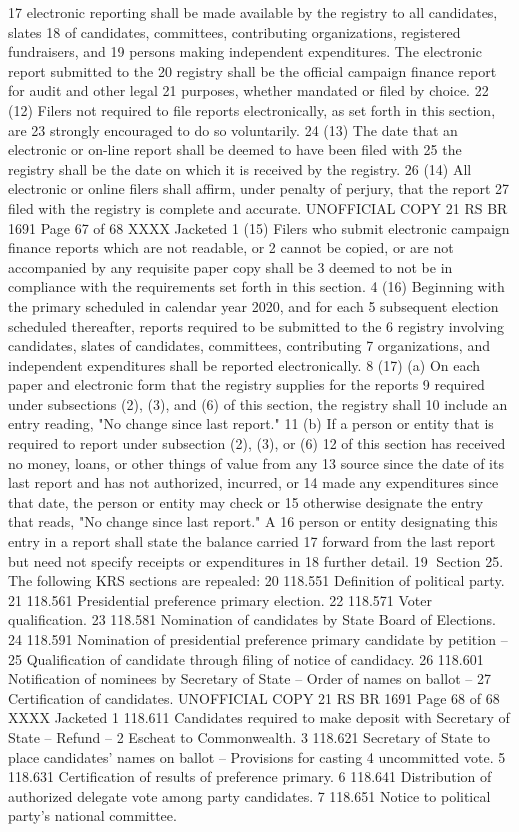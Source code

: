 17 electronic reporting shall be made available by the registry to all candidates, slates
18 of candidates, committees, contributing organizations, registered fundraisers, and
19 persons making independent expenditures. The electronic report submitted to the
20 registry shall be the official campaign finance report for audit and other legal
21 purposes, whether mandated or filed by choice.
22 (12) Filers not required to file reports electronically, as set forth in this section, are
23 strongly encouraged to do so voluntarily.
24 (13) The date that an electronic or on-line report shall be deemed to have been filed with
25 the registry shall be the date on which it is received by the registry.
26 (14) All electronic or online filers shall affirm, under penalty of perjury, that the report
27 filed with the registry is complete and accurate.
UNOFFICIAL COPY 21 RS BR 1691
Page 67 of 68
XXXX Jacketed
1 (15) Filers who submit electronic campaign finance reports which are not readable, or
2 cannot be copied, or are not accompanied by any requisite paper copy shall be
3 deemed to not be in compliance with the requirements set forth in this section.
4 (16) Beginning with the primary scheduled in calendar year 2020, and for each
5 subsequent election scheduled thereafter, reports required to be submitted to the
6 registry involving candidates, slates of candidates, committees, contributing
7 organizations, and independent expenditures shall be reported electronically.
8 (17) (a) On each paper and electronic form that the registry supplies for the reports
9 required under subsections (2), (3), and (6) of this section, the registry shall
10 include an entry reading, "No change since last report."
11 (b) If a person or entity that is required to report under subsection (2), (3), or (6)
12 of this section has received no money, loans, or other things of value from any
13 source since the date of its last report and has not authorized, incurred, or
14 made any expenditures since that date, the person or entity may check or
15 otherwise designate the entry that reads, "No change since last report." A
16 person or entity designating this entry in a report shall state the balance carried
17 forward from the last report but need not specify receipts or expenditures in
18 further detail.
19 Section 25. The following KRS sections are repealed:
20 118.551 Definition of political party.
21 118.561 Presidential preference primary election.
22 118.571 Voter qualification.
23 118.581 Nomination of candidates by State Board of Elections.
24 118.591 Nomination of presidential preference primary candidate by petition --
25 Qualification of candidate through filing of notice of candidacy.
26 118.601 Notification of nominees by Secretary of State -- Order of names on ballot --
27 Certification of candidates. 
UNOFFICIAL COPY 21 RS BR 1691
Page 68 of 68
XXXX Jacketed
1 118.611 Candidates required to make deposit with Secretary of State -- Refund --
2 Escheat to Commonwealth.
3 118.621 Secretary of State to place candidates' names on ballot -- Provisions for casting
4 uncommitted vote.
5 118.631 Certification of results of preference primary.
6 118.641 Distribution of authorized delegate vote among party candidates.
7 118.651 Notice to political party's national committee.